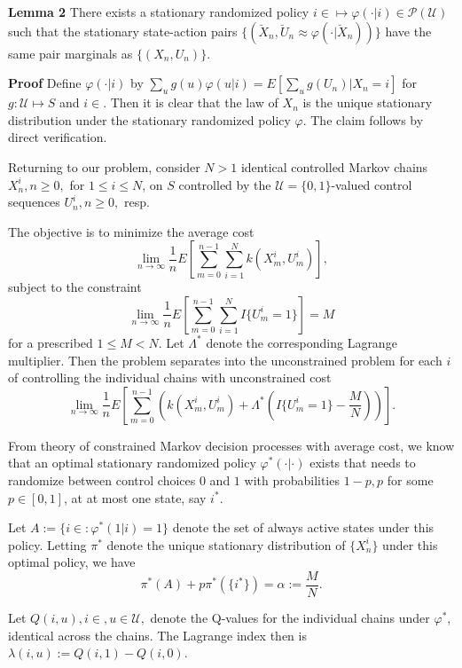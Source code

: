 \documentclass{slides}
\newcommand{\U}{\mathcal{U}}
\newcommand{\PA}{\mathcal{P}}
\begin{document}
{\textbf{Lemma 2} There exists a stationary randomized policy $i \in  \mapsto \varphi( \cdot | i ) \in \PA(\U)$ such that the  stationary state-action pairs $\{(\breve{X}_n,\breve{U}_n \approx \varphi( \cdot |\breve{X}_n))\}$ have the same pair marginals as $\{(X_n,U_n)\}$. 

\newpage

\textbf{Proof} Define $\varphi( \cdot | i)$ by $\sum_ug(u)\varphi(u|i) = E\left[\sum_ug(U_n)|X_n=i\right]$ for $g: \U \mapsto S$ and $i\in$. Then it is clear that the law of $X_n$ is the unique stationary distribution under the stationary randomized policy $\varphi$. The claim follows by direct verification. 

Returning to our problem, consider $N > 1$ identical controlled Markov chains $X^i_n, n \geq 0,$ for $1\leq i \leq N$, on $S$ controlled by the $\U =\{0,1\}$-valued control sequences  $U^i_n, n \geq 0,$ resp. 

\newpage

The objective is to minimize the average cost
$$\lim_{n\to\infty}\frac{1}{n}E\left[\sum_{m=0}^{n-1}\sum_{i=1}^Nk(X^i_m,U^i_m)\right],$$
subject to the constraint
$$\lim_{n\to\infty}\frac{1}{n}E\left[\sum_{m=0}^{n-1}\sum_{i=1}^NI\{U^i_m=1\}\right] = M$$
for a prescribed $1\leq M < N$. Let $\Lambda^*$ denote the corresponding Lagrange multiplier. Then the problem separates into the unconstrained problem for each $i$ of controlling the individual chains with unconstrained cost
$$\lim_{n\to\infty}\frac{1}{n}E\left[\sum_{m=0}^{n-1}\left(k(X^i_m,U^i_m) + \Lambda^*\left(I\{U^i_m=1\}-\frac{M}{N}\right)\right)\right].$$

\newpage

From theory of constrained Markov decision processes with average cost, we know that an optimal stationary randomized policy $\varphi^*(\cdot|\cdot)$ exists that needs to randomize between control choices $0$ and $1$ with probabilities $1-p,p$ for some $p\in[0,1]$, at at most one state, say $i^*$. 

Let $A := \{i\in : \varphi^*(1|i) = 1\}$ denote the set of always active states under this policy. Letting $\pi^*$ denote the unique stationary distribution of $\{X^i_n\}$ under this optimal policy, we have 
\begin{equation}
\pi^*(A) + p\pi^*(\{i^*\}) = \alpha := \frac{M}{N}.\label{act}
\end{equation}

\newpage

Let $Q(i,u), i\in, u\in\U,$ denote the Q-values for the individual chains under $\varphi^*$, identical across the chains. The Lagrange index then is $\lambda(i,u) := Q(i,1)-Q(i,0)$. 

}
\end{document}
